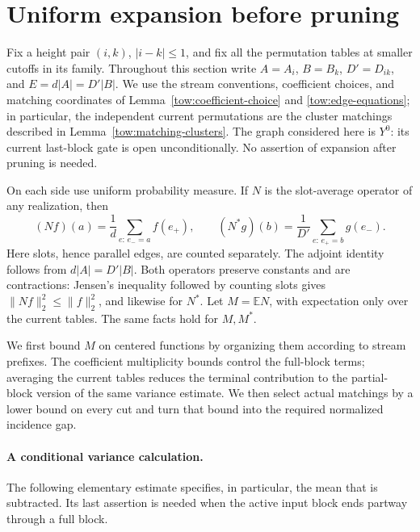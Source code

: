 \section{Uniform expansion before pruning}\label{exp:section}

Fix a height pair $(i,k)$, $|i-k|\leq1$, and fix all the
permutation tables at smaller cutoffs in its family. Throughout this
section write $A=A_i$, $B=B_k$, $D'=D_{ik}$, and
$E=d|A|=D'|B|$. We use the stream conventions, coefficient choices,
and matching coordinates of
Lemma~\ref{tow:coefficient-choice} and
\eqref{tow:edge-equations}; in particular, the independent current
permutations are the cluster matchings described in
Lemma~\ref{tow:matching-clusters}. The graph considered here is $Y^0$:
its current last-block gate is open unconditionally. No assertion of
expansion after pruning is needed.

On each side use uniform probability measure. If $N$ is the slot-average
operator of any realization, then
\[
 (Nf)(a)=\frac1d\sum_{e:\,e_-=a}f(e_+),\qquad
 (N^*g)(b)=\frac1{D'}\sum_{e:\,e_+=b}g(e_-).
\]
Here slots, hence parallel edges, are counted separately. The adjoint
identity follows from $d|A|=D'|B|$. Both operators preserve constants
and are contractions: Jensen's inequality followed by counting slots
gives $\|Nf\|_2^2\leq\|f\|_2^2$, and likewise for $N^*$.
Let $M=\mathbb E N$, with expectation only over the current tables.
The same facts hold for $M,M^*$.

We first bound $M$ on centered functions by organizing them according to
stream prefixes.  The coefficient multiplicity bounds control the full-block
terms; averaging the current tables reduces the terminal contribution to
the partial-block version of the same variance estimate.
We then select actual matchings by a lower bound on every cut and turn
that bound into the required normalized incidence gap.

\paragraph{A conditional variance calculation.}
The following elementary estimate specifies, in particular, the mean
that is subtracted. Its last assertion is needed when the active input
block ends partway through a full block.

